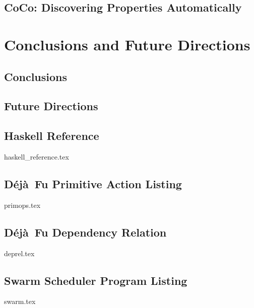 \documentclass[openright,imperial,11pt]{octavo}
\newcommand{\dejafu}{D\'{e}j\`{a}~Fu}
\begin{document}
\chapter{CoCo: Discovering Properties Automatically}
\label{chp:coco}


\part{Conclusions and Future Directions}
\label{part:end}

\chapter{Conclusions}
\label{chp:conclusions}


\chapter{Future Directions}
\label{chp:future_work}


\begin{appendices}
\chapter{Haskell Reference}
\label{app:haskell}
{haskell_reference.tex}

\chapter{\dejafu{} Primitive Action Listing}
\label{app:semantics}
{primops.tex}

\chapter{\dejafu{} Dependency Relation}
\label{app:deprel}
{deprel.tex}

\chapter{Swarm Scheduler Program Listing}
\label{app:swarm}
{swarm.tex}
\end{appendices}

\printbibliography[heading=bibintoc]
\end{document}
